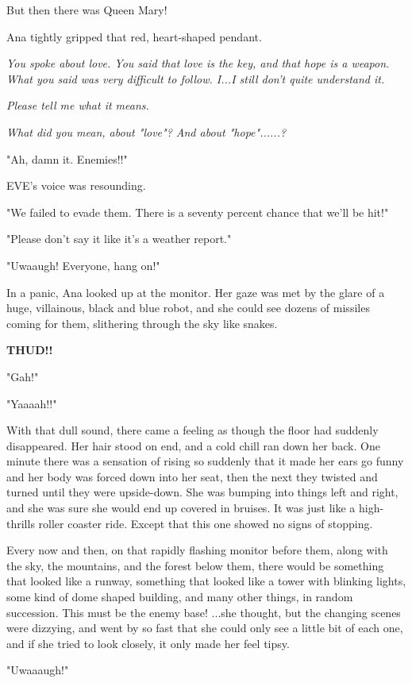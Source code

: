 \documentclass[
]{article}
\begin{document}
But then there was Queen Mary!

Ana tightly gripped that red, heart-shaped pendant.

\emph{You spoke about love. You said that love is the key, and that hope
is a weapon. What you said was very difficult to follow. I...I still
don't quite understand it.}

\emph{Please tell me what it means.}

\emph{What did you mean, about "love"? And about "hope"......?}

"Ah, damn it. Enemies!!"

EVE's voice was resounding.

"We failed to evade them. There is a seventy percent chance that we'll
be hit!"

"Please don't say it like it's a weather report."

"Uwaaugh! Everyone, hang on!"

In a panic, Ana looked up at the monitor. Her gaze was met by the glare
of a huge, villainous, black and blue robot, and she could see dozens of
missiles coming for them, slithering through the sky like snakes.

\textbf{THUD!!}

"Gah!"

"Yaaaah!!"

With that dull sound, there came a feeling as though the floor had
suddenly disappeared. Her hair stood on end, and a cold chill ran down
her back. One minute there was a sensation of rising so suddenly that it
made her ears go funny and her body was forced down into her seat, then
the next they twisted and turned until they were upside-down. She was
bumping into things left and right, and she was sure she would end up
covered in bruises. It was just like a high-thrills roller coaster ride.
Except that this one showed no signs of stopping.

Every now and then, on that rapidly flashing monitor before them, along
with the sky, the mountains, and the forest below them, there would be
something that looked like a runway, something that looked like a tower
with blinking lights, some kind of dome shaped building, and many other
things, in random succession. This must be the enemy base! ...she
thought, but the changing scenes were dizzying, and went by so fast that
she could only see a little bit of each one, and if she tried to look
closely, it only made her feel tipsy.

"Uwaaaugh!"
\end{document}
